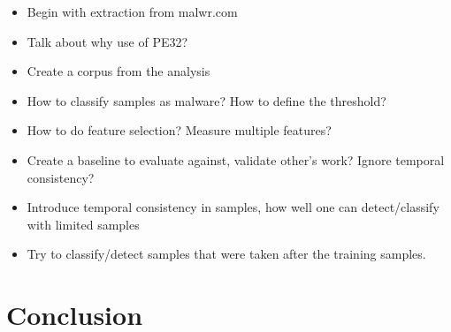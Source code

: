 \documentclass{llncs}
\begin{document}
\clearpage

\begin{itemize}
	\item Begin with extraction from malwr.com
	\item Talk about why use of PE32?
	\item Create a corpus from the analysis
	\item How to classify samples as malware? How to define the threshold?
	\item How to do feature selection? Measure multiple features?
	\item Create a baseline to evaluate against, validate other's work? Ignore temporal consistency?
	\item Introduce temporal consistency in samples, how well one can detect/classify with limited samples
	\item Try to classify/detect samples that were taken after the training samples.
\end{itemize}



\section{Conclusion}\label{sec:conclusion}


\begin{thebibliography}{}

\end{thebibliography}
\end{document}
